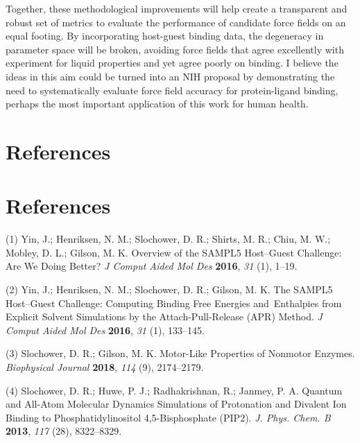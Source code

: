 \documentclass[11pt,notitlepage]{article}
\begin{document}
Together, these methodological improvements will help create a
transparent and robust set of metrics to evaluate the performance of
candidate force fields on an equal footing. By incorporating host-guest
binding data, the degeneracy in parameter space will be broken, avoiding
force fields that agree excellently with experiment for liquid
properties and yet agree poorly on binding. I believe the ideas in this
aim could be turned into an NIH proposal by demonstrating the need to
systematically evaluate force field accuracy for protein-ligand binding,
perhaps the most important application of this work for human health.

\pagebreak
\setlength{\parskip}{0.1mm}

\hypertarget{references}{%
\section*{References}\label{references}}


\pagebreak
\setlength{\parskip}{0.1mm}

\hypertarget{references-1}{%
\section*{References}\label{references-1}}


\hypertarget{refs}{}
\leavevmode\hypertarget{ref-BGsUYQln}{}%
(1) Yin, J.; Henriksen, N. M.; Slochower, D. R.; Shirts, M. R.; Chiu, M.
W.; Mobley, D. L.; Gilson, M. K. Overview of the SAMPL5 Host--Guest
Challenge: Are We Doing Better? \emph{J Comput Aided Mol Des}
\textbf{2016}, \emph{31} (1), 1--19.

\leavevmode\hypertarget{ref-uzHaEv9Z}{}%
(2) Yin, J.; Henriksen, N. M.; Slochower, D. R.; Gilson, M. K. The
SAMPL5 Host--Guest Challenge: Computing Binding Free Energies
and~Enthalpies from Explicit Solvent Simulations by the
Attach-Pull-Release (APR) Method. \emph{J Comput Aided Mol Des}
\textbf{2016}, \emph{31} (1), 133--145.

\leavevmode\hypertarget{ref-1BfYw0gk2}{}%
(3) Slochower, D. R.; Gilson, M. K. Motor-Like Properties of Nonmotor
Enzymes. \emph{Biophysical Journal} \textbf{2018}, \emph{114} (9),
2174--2179.

\leavevmode\hypertarget{ref-1G0A01ZNq}{}%
(4) Slochower, D. R.; Huwe, P. J.; Radhakrishnan, R.; Janmey, P. A.
Quantum and All-Atom Molecular Dynamics Simulations of Protonation and
Divalent Ion Binding to Phosphatidylinositol 4,5-Bisphosphate (PIP2).
\emph{J. Phys. Chem. B} \textbf{2013}, \emph{117} (28), 8322--8329.
\end{document}
